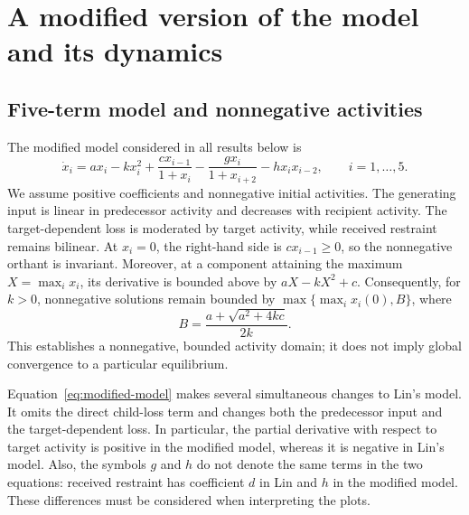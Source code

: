 \section{A modified version of the model and its dynamics}
\label{sec:modified-results}

\subsection{Five-term model and nonnegative activities}
The modified model considered in all results below is
\begin{equation}
 \dot x_i=a x_i-kx_i^2+\frac{c x_{i-1}}{1+x_i}
                  -\frac{g x_i}{1+x_{i+2}}-h x_i x_{i-2},
 \qquad i=1,\ldots,5.
 \label{eq:modified-model}
\end{equation}
We assume positive coefficients and nonnegative initial activities.
The generating input is linear in predecessor activity and decreases with
recipient activity. The target-dependent loss is moderated by target
activity, while received restraint remains bilinear.
At $x_i=0$, the right-hand side is $c x_{i-1}\geq0$, so the nonnegative
orthant is invariant. Moreover, at a component attaining the maximum
$X=\max_i x_i$, its derivative is bounded above by
$aX-kX^2+c$. Consequently, for $k>0$, nonnegative solutions remain bounded
by $\max\{\max_i x_i(0),B\}$, where
\begin{equation}
 B=\frac{a+\sqrt{a^2+4kc}}{2k}.
\end{equation}
This establishes a nonnegative, bounded activity domain; it does not imply
global convergence to a particular equilibrium.

Equation~\eqref{eq:modified-model} makes several simultaneous changes to
Lin's model. It omits the direct child-loss term and changes both the
predecessor input and the target-dependent loss. In particular, the
partial derivative with respect to target activity is positive in the
modified model, whereas it is negative in Lin's model. Also, the symbols
$g$ and $h$ do not denote the same terms in the two equations:
received restraint has coefficient $d$ in Lin and $h$ in the modified
model. These differences must be considered when interpreting the plots.

